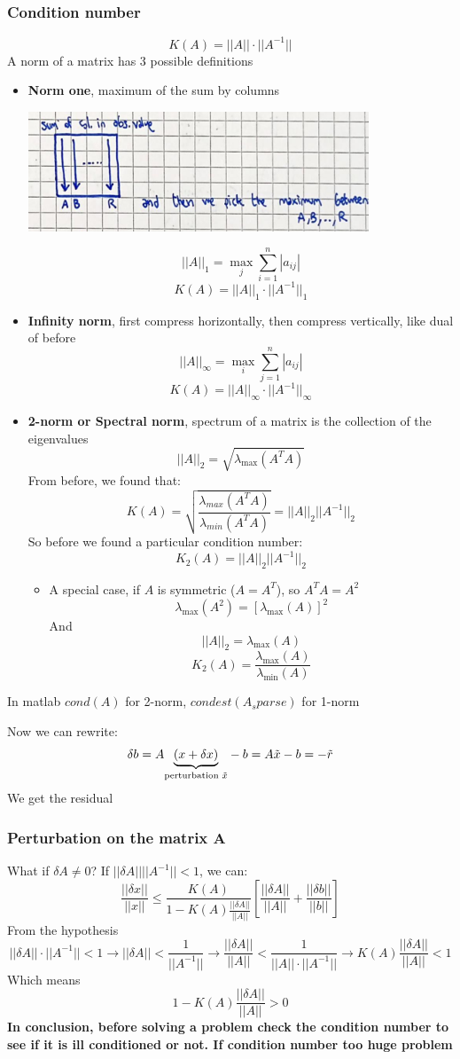 \subsubsection{Condition number}
$$
K(A)=||A||\cdot||A^{-1}||
$$
A norm of a matrix has 3 possible definitions
\begin{itemize}
    \item \textbf{Norm one}, maximum of the sum by columns
    \begin{center}
        \includegraphics[width=0.8\textwidth]{images/normone.png}
    \end{center}
    $$||A||_1=\max_j\sum_{i=1}^n|a_{ij}|$$
    $$K(A)=||A||_1\cdot||A^{-1}||_1$$
    \item \textbf{Infinity norm}, first compress horizontally, then compress vertically, like dual of before
    $$||A||_\infty=\max_i\sum_{j=1}^n|a_{ij}|$$
    $$K(A)=||A||_\infty\cdot||A^{-1}||_\infty$$
    \item \textbf{2-norm or Spectral norm}, spectrum of a matrix is the collection of the eigenvalues
    $$
    ||A||_2=\sqrt{\lambda_{\max}(A^TA)}
    $$
    From before, we found that:
    $$
    K(A)=\sqrt{\frac{
        \lambda_{max}(A^TA)
    }{\lambda_{min}(A^TA)}}=||A||_2||A^{-1}||_2
    $$
    So before we found a particular condition number:
    $$K_2(A)=||A||_2||A^{-1}||_2$$
    \begin{itemize}
        \item A special case, if $A$ is symmetric ($A=A^T$), so $A^TA=A^2$
        $$
        \lambda_{\max}(A^2)=[\lambda_{\max}(A)]^2
        $$
        And
        $$
        ||A||_2=\lambda_{\max}(A)
        $$
        $$
        K_2(A)=\frac{\lambda_{\max}(A)}{\lambda_{\min}(A)}
        $$
    \end{itemize}
\end{itemize}
In matlab $cond(A)$ for 2-norm, $condest(A_sparse)$ for 1-norm

Now we can rewrite:
$$
\delta b = A\underlabel{(x+\delta x)}{perturbation $\tilde{x}$}-b=A\tilde{x}-b=-\tilde{r}
$$
We get the residual

\subsubsection{Perturbation on the matrix A}
What if $\delta A\neq 0$? If $||\delta A||||A^{-1}||<1$, we can:
$$
\frac{||\delta x||}{||x||}
\leq
\frac{K(A)}{1-K(A)\frac{||\delta A||}{||A||}}
\left[
    \frac{||\delta A||}{||A||}+\frac{||\delta b||}{||b||}
\right]
$$
From the hypothesis
$$
||\delta A||\cdot||A^{-1}||<1
\rightarrow
||\delta A||<\frac{1}{||A^{-1}||}
\rightarrow
\frac{||\delta A||}{||A||}<\frac{1}{||A||\cdot||A^{-1}||}
\rightarrow
K(A)\frac{||\delta A||}{||A||}<1
$$
Which means
$$
1-K(A)\frac{||\delta A||}{||A||}>0
$$
\textbf{In conclusion, before solving a problem check the condition number to see if it is ill conditioned or not. If condition number too huge problem}